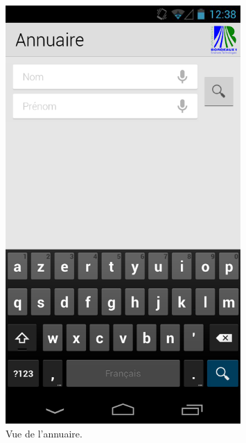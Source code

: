 \documentclass [pdftex,12pt] {report}
\begin{document}
\begin{figure}
  \begin{minipage}[t]{8cm}
    \centering
    \includegraphics[width=0.8\textwidth]{resources/ui_preview/05}
    \caption{Vue de l'annuaire.}
    \label{fig:05}
  \end{minipage}
  \hspace{+20pt}
  \begin{minipage}[t]{8cm}
    \centering

\end{minipage}
\end{figure}
\end{document}
